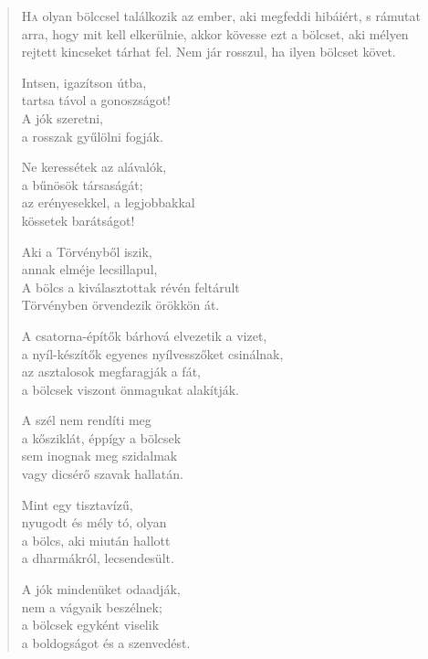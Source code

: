 
\begin{verse}

{\par%
\lettrine{H}{a} {\LettrineTextFont olyan bölccsel találkozik}\newline
az ember, aki megfeddi hibáiért,\newline
s rámutat arra, hogy mit kell elkerülnie,\verselinebreak
akkor kövesse ezt a bölcset,\verselinebreak
aki mélyen rejtett kincseket tárhat fel.\verselinebreak
Nem jár rosszul, ha ilyen bölcset követ.
\par}

 Intsen, igazítson útba,\\
tartsa távol a gonoszságot!\\
A jók szeretni,\\
a rosszak gyűlölni fogják.

 Ne keressétek az alávalók,\\
a bűnösök társaságát;\\
az erényesekkel, a legjobbakkal\\
kössetek barátságot!

 Aki a Törvényből iszik,\\
annak elméje lecsillapul,\\
A bölcs a kiválasztottak révén feltárult\\
Törvényben örvendezik örökkön át.

 A csatorna-építők bárhová elvezetik a vizet,\\
a nyíl-készítők egyenes nyílvesszőket csinálnak,\\
az asztalosok megfaragják a fát,\\
a bölcsek viszont önmagukat alakítják.

 A szél nem rendíti meg\\
a kősziklát, éppígy a bölcsek\\
sem inognak meg szidalmak\\
vagy dicsérő szavak hallatán.

 Mint egy tisztavízű,\\
nyugodt és mély tó, olyan\\
a bölcs, aki miután hallott\\
a dharmákról, lecsendesült.

 A jók mindenüket odaadják,\\
nem a vágyaik beszélnek;\\
a bölcsek egyként viselik\\
a boldogságot és a szenvedést.


\end{verse}
